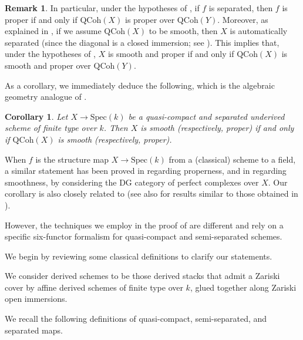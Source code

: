 \documentclass[oneside, hidelinks, 12pt, a4paper,reqno]{amsart}
\theoremstyle{plain}
\theoremstyle{definition}
\newtheorem{remark}[remark]{Remark}
\theoremstyle{plain}
\newtheorem{corollary}[corollary]{Corollary}
\newcommand{\Spec}{\mathrm{Spec}}
\newcommand{\Qcoh}{\mathrm{QCoh}}
\begin{document}
\begin{remark}
    In particular, under the hypotheses of , if $f$ is separated, then $f$ is proper if and only if $\Qcoh(X)$ is proper over $\Qcoh(Y)$. Moreover, as explained in \cite[Theorem 11.4.2.1]{SAG}, if we assume $\Qcoh(X)$ to be smooth, then $X$ is automatically separated (since the diagonal is a closed immersion; see \cite[Lemma 11.3.6.2]{SAG}). This implies that, under the hypotheses of , $X$ is smooth and proper if and only if $\Qcoh(X)$ is smooth and proper over $\Qcoh(Y)$.
\end{remark}

As a corollary, we immediately deduce the following, which is the algebraic geometry analogue of .

\begin{corollary}
    Let $X \to \Spec(k)$ be a quasi-compact and separated underived scheme of finite type over $k$. Then $X$ is smooth (respectively, proper) if and only if $\Qcoh(X)$ is smooth (respectively, proper).
\end{corollary}

When $f$ is the structure map $X \to \Spec(k)$ from a (classical) scheme to a field, a similar statement has been proved in \cite[Proposition 3.30]{Orlov_2016noncommutativeschemes} regarding properness, and in \cite[Proposition 3.13]{lunts2009categoricalresolutionsingularities} regarding smoothness, by considering the DG category of perfect complexes over $X$. Our corollary is also closely related to \cite[Theorem 11.4.2.1]{SAG} (see also \cite[Proposition 11.1.4.3 and Theorem 11.3.6.1]{SAG} for results similar to those obtained in ).

However, the techniques we employ in the proof of  are different and rely on a specific six-functor formalism for quasi-compact and semi-separated schemes.

We begin by reviewing some classical definitions to clarify our statements.

We consider derived schemes to be those derived stacks that admit a Zariski cover by affine derived schemes of finite type over $k$, glued together along Zariski open immersions.

We recall the following definitions of quasi-compact, semi-separated, and separated maps.
\end{document}
